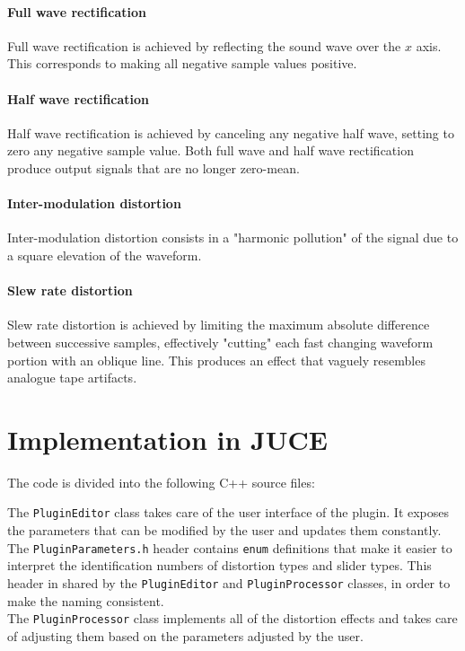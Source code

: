 \documentclass{article}
\newcommand{\code}{\texttt}
\begin{document}
\paragraph{Full wave rectification} 
Full wave rectification is achieved by reflecting the sound wave over the $x$ axis. This corresponds to making all negative sample values positive.
\paragraph{Half wave rectification} 
Half wave rectification is achieved by canceling any negative half wave, setting to zero any negative sample value. Both full wave and half wave rectification produce output signals that are no longer zero-mean.
\paragraph{Inter-modulation distortion} 
Inter-modulation distortion consists in a "harmonic pollution" of the signal due to a square elevation of the waveform. 
\paragraph{Slew rate distortion}
Slew rate distortion is achieved by limiting the maximum absolute difference between successive samples, effectively "cutting" each fast changing waveform portion with an oblique line. This produces an effect that vaguely resembles analogue tape artifacts.

\section{Implementation in JUCE}
The code is divided into the following C++ source files:
\bigskip

{} %

\bigskip
\noindent The \code{PluginEditor} class takes care of the user interface of the plugin. It exposes the parameters that can be modified by the user and updates them constantly.\\
The \code{PluginParameters.h} header contains \code{enum} definitions that make it easier to interpret the identification numbers of distortion types and slider types. This header in shared by the \code{PluginEditor} and \code{PluginProcessor} classes, in order to make the naming consistent.\\
The \code{PluginProcessor} class implements all of the distortion effects and takes care of adjusting them based on the parameters adjusted by the user.
\end{document}
